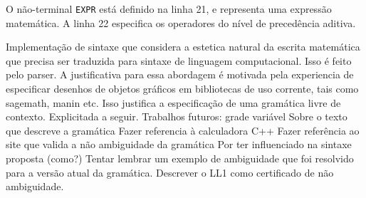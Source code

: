 O não-terminal \texttt{EXPR} está definido na linha 21, e representa uma expressão matemática.
A linha 22 especifica os operadores do nível de precedência aditiva.

Implementação de sintaxe que considera a estetica natural da escrita matemática que precisa ser traduzida para sintaxe de linguagem computacional. Isso é feito pelo parser.
A justificativa para essa abordagem é motivada pela experiencia de especificar desenhos de objetos gráficos em bibliotecas de uso corrente, tais como sagemath, manin etc.
Isso justifica a especificação de uma gramática livre de contexto. Explicitada a seguir.
Trabalhos futuros: grade variável
Sobre o texto que descreve a gramática
Fazer referencia à calculadora C++
Fazer referência ao site que valida a não ambiguidade da gramática
Por ter influenciado na sintaxe proposta (como?)
Tentar lembrar um exemplo de ambiguidade que foi resolvido para a versão atual da gramática.
Descrever o LL1 como certificado de não ambiguidade.
